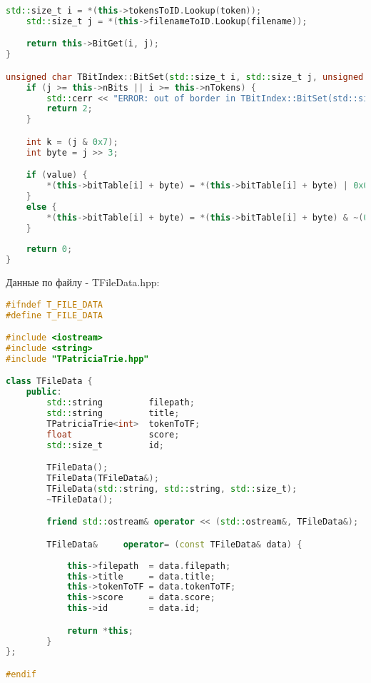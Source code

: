 \begin{lstlisting}[language=C++]
    std::size_t i = *(this->tokensToID.Lookup(token));
    std::size_t j = *(this->filenameToID.Lookup(filename));

    return this->BitGet(i, j);
}

unsigned char TBitIndex::BitSet(std::size_t i, std::size_t j, unsigned char value) {
    if (j >= this->nBits || i >= this->nTokens) {
        std::cerr << "ERROR: out of border in TBitIndex::BitSet(std::size_t, std::size_t, unsigned char)!" << std::endl;
        return 2;
    }

    int k = (j & 0x7);
    int byte = j >> 3;

    if (value) {
        *(this->bitTable[i] + byte) = *(this->bitTable[i] + byte) | 0x01 << k;
    }
    else {
        *(this->bitTable[i] + byte) = *(this->bitTable[i] + byte) & ~(0x01 << k);
    }
    
    return 0;
}

\end{lstlisting}

Данные по файлу - TFileData.hpp:
\begin{lstlisting}[language=C++]
#ifndef T_FILE_DATA
#define T_FILE_DATA

#include <iostream>
#include <string>
#include "TPatriciaTrie.hpp"

class TFileData {
    public:
        std::string         filepath;
        std::string         title;
        TPatriciaTrie<int>  tokenToTF;
        float               score;
        std::size_t         id;

        TFileData();
        TFileData(TFileData&);
        TFileData(std::string, std::string, std::size_t);
        ~TFileData();

        friend std::ostream& operator << (std::ostream&, TFileData&);

        TFileData&     operator= (const TFileData& data) {
            
            this->filepath  = data.filepath;
            this->title     = data.title;
            this->tokenToTF = data.tokenToTF;
            this->score     = data.score;
            this->id        = data.id;

            return *this;
        }
};

#endif
\end{lstlisting}

